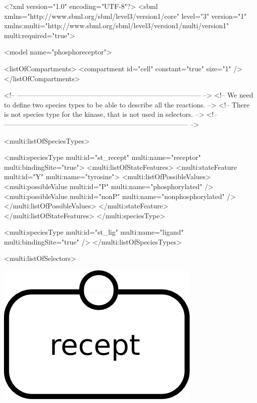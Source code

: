 \begin{example}
<?xml version="1.0" encoding="UTF-8"?>
<sbml xmlns="http://www.sbml.org/sbml/level3/version1/core" level="3" version="1"
      xmlns:multi="http://www.sbml.org/sbml/level3/version1/multi/version1"
      multi:required="true">

  <model name="phosphoreceptor">

    <listOfCompartments>
      <compartment id="cell" constant="true" size="1" />
    </listOfCompartments>

<!-- -------------------------------------------------------------------------------- -->
<!-- We need to define two species types to be able to describe all the reactions.    -->
<!-- There is not species type for the kinase, that is not used in selectors.         -->
<!-- -------------------------------------------------------------------------------- -->

    <multi:listOfSpeciesTypes>
    
      <multi:speciesType multi:id="st_recept" 
                         multi:name="receptor" 
                         multi:bindingSite="true">
        <multi:listOfStateFeatures>
          <multi:stateFeature multi:id="Y" multi:name="tyrosine">
            <multi:listOfPossibleValues>      
              <multi:possibleValue multi:id="P" multi:name="phosphorylated" />
              <multi:possibleValue multi:id="nonP" multi:name="nonphosphorylated" />
            </multi:listOfPossibleValues>
          </multi:stateFeature>
        </multi:listOfStateFeatures>
      </multi:speciesType>
      
      <multi:speciesType multi:id="st_lig" multi:name="ligand" multi:bindingSite="true" />
    </multi:listOfSpeciesTypes>

    <multi:listOfSelectors>
\end{example}

\includegraphics{figs/pngs/sel_freereceptor_nonP.png}

